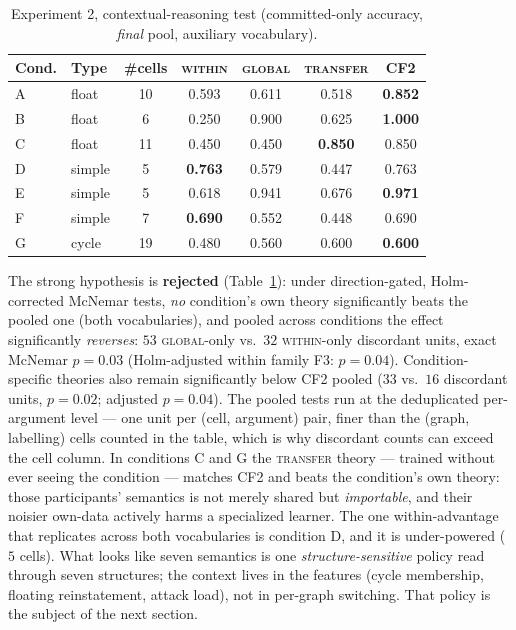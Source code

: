 \documentclass[review,12pt]{elsarticle}
\theoremstyle{definition}
\theoremstyle{remark}
\newcommand{\best}[1]{\textbf{#1}}
\begin{document}
\begin{table}[t]
\centering
\small
\caption{Experiment 2, contextual-reasoning test (committed-only accuracy,
\emph{final} pool, auxiliary vocabulary).}
\label{tab:act3}
\begin{tabular}{llccccc}
\toprule
Cond. & Type & \#cells & \textsc{within} & \textsc{global} & \textsc{transfer} & CF2\\
\midrule
A & float  & 10 & 0.593 & 0.611 & 0.518 & \best{0.852}\\
B & float  &  6 & 0.250 & 0.900 & 0.625 & \best{1.000}\\
C & float  & 11 & 0.450 & 0.450 & \best{0.850} & 0.850\\
D & simple &  5 & \best{0.763} & 0.579 & 0.447 & 0.763\\
E & simple &  5 & 0.618 & 0.941 & 0.676 & \best{0.971}\\
F & simple &  7 & \best{0.690} & 0.552 & 0.448 & 0.690\\
G & cycle  & 19 & 0.480 & 0.560 & 0.600 & \best{0.600}\\
\bottomrule
\end{tabular}
\end{table}

The strong hypothesis is \textbf{rejected} (Table~\ref{tab:act3}): under
direction-gated, Holm-corrected McNemar tests, \emph{no} condition's own theory
significantly beats the pooled one (both vocabularies), and pooled across
conditions the effect significantly \emph{reverses}: $53$ \textsc{global}-only
vs.\ $32$ \textsc{within}-only discordant units, exact McNemar $p=0.03$
(Holm-adjusted within family F3: $p=0.04$).
Condition-specific theories also remain significantly below CF2 pooled ($33$
vs.\ $16$ discordant units, $p=0.02$; adjusted $p=0.04$). The pooled tests run at the
deduplicated per-argument level --- one unit per (cell, argument) pair, finer
than the (graph, labelling) cells counted in the table, which is why discordant
counts can exceed the cell column. In conditions C and G the
\textsc{transfer} theory --- trained without ever seeing the condition ---
matches CF2 and beats the condition's own theory: those participants' semantics
is not merely shared but \emph{importable}, and their noisier own-data actively
harms a specialized learner. The one within-advantage that replicates across
both vocabularies is condition D, and it is under-powered ($5$ cells). What
looks like seven semantics is one \emph{structure-sensitive} policy read
through seven structures; the context lives in the features (cycle membership,
floating reinstatement, attack load), not in per-graph switching. That policy
is the subject of the next section.
\end{document}
